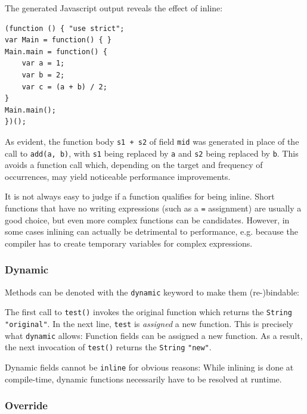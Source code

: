 \documentclass{article}
\newcommand{\target}[1]{#1}
\newcommand{\type}[1]{\texttt{#1}}
\newcommand{\expr}[1]{\texttt{#1}}
\begin{document}


The generated \target{Javascript} output reveals the effect of inline:

\begin{lstlisting}
(function () { "use strict";
var Main = function() { }
Main.main = function() {
	var a = 1;
	var b = 2;
	var c = (a + b) / 2;
}
Main.main();
})();
\end{lstlisting}

As evident, the function body \expr{s1 + s2} of field \expr{mid} was generated in place of the call to \expr{add(a, b)}, with \expr{s1} being replaced by \expr{a} and \expr{s2} being replaced by \expr{b}. This avoids a function call which, depending on the target and frequency of occurrences, may yield noticeable performance improvements.

It is not always easy to judge if a function qualifies for being inline. Short functions that have no writing expressions (such as a \expr{=} assignment) are usually a good choice, but even more complex functions can be candidates. However, in some cases inlining can actually be detrimental to performance, e.g. because the compiler has to create temporary variables for complex expressions.

\subsubsection{Dynamic}
\label{Dynamic}

Methods can be denoted with the \expr{dynamic} keyword to make them (re-)bindable:



The first call to \expr{test()} invokes the original function which returns the \type{String} \expr{"original"}. In the next line, \expr{test} is \emph{assigned} a new function. This is precisely what \expr{dynamic} allows: Function fields can be assigned a new function. As a result, the next invocation of \expr{test()} returns the \type{String} \expr{"new"}.

Dynamic fields cannot be \expr{inline} for obvious reasons: While inlining is done at compile-time, dynamic functions necessarily have to be resolved at runtime.


\subsubsection{Override}
\label{Override}
\end{document}
